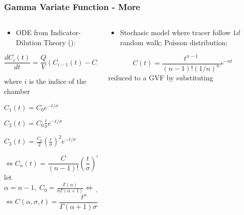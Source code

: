 %
% 

\begin{frame}
  \frametitle{Gamma Variate Function - More}

    \begin{columns}
    \begin{column}{0.45\textwidth}                 %
    {\footnotesize
    \cite{davenportDerivationGammaVariateRelationship1983}

    \begin{itemize}
        \item ODE from Indicator-Dilution Theory \newline (\cite{zierlerTheoreticalBasisIndicatorDilution1962}):
    \end{itemize}
    \begin{equation}
    \frac{dC_{i}(t)}{dt} = \frac{Q}{V} (C_{i-1}(t) - C_{i}(t))
    \end{equation}
    {\tiny
    where $i$ is the indice of the chamber
    
    $C_{1}(t) = C_{0}e^{-t/\sigma}$

    $C_{2}(t) = C_{0}\frac{t}{\sigma}e^{-t/\sigma}$

    $C_{3}(t) = \frac{C_{0}}{2}(\frac{t}{\sigma})^{2}e^{-t/\sigma}$
    }
    \vspace{-8pt}
    \begin{equation}
    \Leftrightarrow C_{n}(t) = \frac{C}{(n-1)!}(\frac{t}{\sigma})^{n-1}e^{-t/\sigma}
    \end{equation}
    {\tiny
    let $\alpha = n - 1, \; C_0 = \frac{\Gamma(\alpha)}{\sigma\Gamma(\alpha+1)} \Leftrightarrow \int^{\infty}_{0}C(t)dt = 0 $
    }
    \vspace{-8pt}
    \begin{equation}
    \Leftrightarrow C(\alpha, \sigma, t) = \frac{t^\alpha}{\Gamma(\alpha+1)\sigma^{\alpha+1}}e^{-t/\sigma}
    \end{equation}
    
    }
    \end{column}
    
    \hspace*{2em}                                                          %
    
    \begin{column}{0.5\textwidth}                                %
    {\tiny
    \begin{block}{\textwidth}
        \cite{sheppardMathematicalConsiderationsIndicator1954}
        \begin{itemize}
            \item Stochasic model where tracer follow $1d$ random walk; Poisson distribution:
        \end{itemize}
        \begin{equation}
            C(t) = \frac{t^{n-1}}{(n-1)!(1/n)^{n}}e^{-nt}
        \end{equation}
        reduced to a GVF by substituting
    

\end{block}}
\end{column}
\end{columns}
\end{frame}
